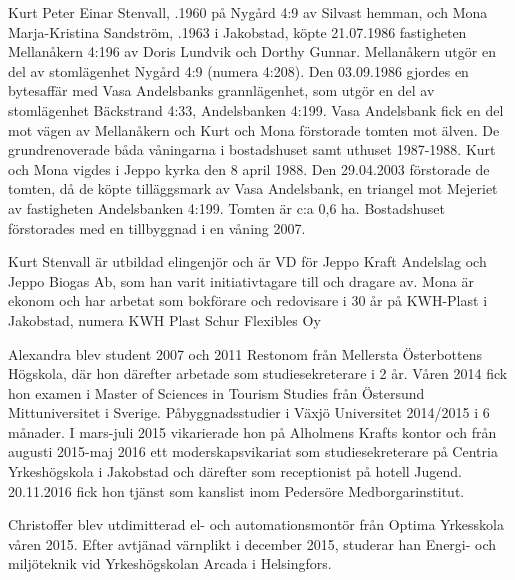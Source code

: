 
Kurt Peter Einar Stenvall, .1960 på Nygård 4:9 av Silvast hemman, och Mona Marja-Kristina Sandström, .1963 i 	Jakobstad, köpte 21.07.1986 fastigheten Mellanåkern 4:196 av Doris Lundvik och Dorthy Gunnar. Mellanåkern utgör en del av	stomlägenhet Nygård 4:9 (numera 4:208). Den 03.09.1986 gjordes en bytesaffär med Vasa Andelsbanks grannlägenhet, som utgör en del av stomlägenhet Bäckstrand 4:33, Andelsbanken 4:199. Vasa Andelsbank fick en del mot vägen av Mellanåkern och Kurt och Mona förstorade	tomten mot älven. De grundrenoverade båda våningarna i	bostadshuset samt uthuset 1987-1988.
Kurt och Mona vigdes i Jeppo	kyrka den 8 april 1988. Den 29.04.2003 förstorade de tomten, då de köpte tilläggsmark av Vasa Andelsbank, en triangel mot Mejeriet av fastigheten Andelsbanken 4:199. Tomten är c:a 0,6 ha.	Bostadshuset förstorades med en tillbyggnad i en våning 2007.

Kurt Stenvall är utbildad elingenjör och är VD för Jeppo Kraft Andelslag och Jeppo Biogas Ab, som han varit initiativtagare till och dragare av. Mona är ekonom och har arbetat som bokförare och redovisare i 30 år på	KWH-Plast i Jakobstad, numera KWH Plast Schur Flexibles Oy
\begin{jhchildren}
  \item {}
  \item {}
\end{jhchildren}
Alexandra blev student 2007 och 2011 Restonom från Mellersta Österbottens Högskola, där hon därefter arbetade som studiesekreterare i 2 år. Våren 2014 fick hon examen i Master of Sciences in Tourism Studies från Östersund Mittuniversitet i Sverige.  Påbyggnadsstudier i	Växjö Universitet 2014/2015 i 6 månader. I mars-juli 2015 vikarierade		hon på Alholmens Krafts kontor och från augusti 2015-maj 2016 ett moderskapsvikariat som studiesekreterare på Centria Yrkeshögskola i	Jakobstad och därefter som receptionist på hotell Jugend. 20.11.2016 fick hon tjänst som kanslist inom Pedersöre Medborgarinstitut.

Christoffer blev utdimitterad el- och automationsmontör från Optima Yrkesskola våren 2015. Efter avtjänad värnplikt i december 2015, studerar han Energi- och miljöteknik vid Yrkeshögskolan Arcada i Helsingfors.


